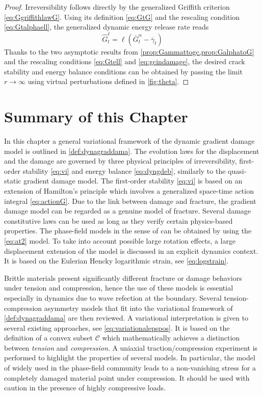 \begin{proof}
Irreversibility follows directly by the generalized Griffith criterion \eqref{eq:GgriffithlawG}. Using its definition \eqref{eq:GtG} and the rescaling condition \eqref{eq:Gtalphaell}, the generalized dynamic energy release rate reads
\[
\widehat{G}^\ell_t=\ell(\overline{G}_t^\alpha-\overline{\gamma}_t)
\]
Thanks to the two asymptotic results from \cref{prop:Gammattogc,prop:GalphatoG} and the rescaling conditions \eqref{eq:Gtell} and \eqref{eq:gcindamage}, the desired crack stability and energy balance conditions can be obtained by passing the limit $r\to\infty$ using virtual perturbations defined in \cref{fig:theta}.
\end{proof}

\section*{Summary of this Chapter}
In this chapter a general variational framework of the dynamic gradient damage model is outlined in \cref{def:dynagraddama}. The evolution laws for the displacement and the damage are governed by three physical principles of irreversibility, first-order stability \eqref{eq:vi} and energy balance \eqref{eq:dyngdeb}, similarly to the quasi-static gradient damage model. The first-order stability \eqref{eq:vi} is based on an extension of Hamilton's principle which involves a generalized space-time action integral \eqref{eq:actionG}. Due to the link between damage and fracture, the gradient damage model can be regarded as a genuine model of fracture. Several damage constitutive laws can be used as long as they verify certain physics-based properties. The phase-field models in the sense of \cite{MieheHofackerWelschinger:2010,MieheWelschingerHofacker:2010} can be obtained by using the \eqref{eq:at2} model. To take into account possible large rotation effects, a large displacement extension of the model is discussed in an explicit dynamics context. It is based on the Eulerian Hencky logarithmic strain, see \eqref{eq:logstrain}.

Brittle materials present significantly different fracture or damage behaviors under tension and compression, hence the use of these models is essential especially in dynamics due to wave refection at the boundary. Several tension-compression asymmetry models that fit into the variational framework of \cref{def:dynagraddama} are then reviewed. A variational interpretation is given to several existing approaches, see \eqref{eq:variationalepspos}. It is based on the definition of a convex subset $\mathcal{C}$ which mathematically achieves a distinction between \emph{tension} and \emph{compression}. A uniaxial traction/compression experiment is performed to highlight the properties of several models. In particular, the model of \cite{MieheHofackerWelschinger:2010} widely used in the phase-field community leads to a non-vanishing stress for a completely damaged material point under compression. It should be used with caution in the presence of highly compressive loads.

